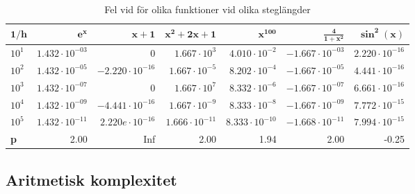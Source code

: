 \documentclass[a4paper,titlepage]{article}
\begin{document}
\begin{table}[h]
    \begin{tabular}{l | r | r | r | r | r | r}
        $\mathbf{1/h}$ & $\mathbf{e^x}$ & $\mathbf{x + 1}$ & $\mathbf{x^2 + 2x + 1}$ & $\mathbf{x^{100}}$ & $\mathbf{\frac{4}{1 + x^2}}$ & $\mathbf{\sin^2(x)}$ \\ \hline
        $10^1$         & $1.432 \cdot 10^{-03}$ & $0                    $  & $1.667 \cdot 10^{3}  $ & $4.010 \cdot 10^{-2} $ & $-1.667 \cdot 10^{-03}$ & $2.220 \cdot 10^{-16}$ \\
        $10^2$         & $1.432 \cdot 10^{-05}$ & $-2.220 \cdot 10^{-16}$  & $1.667 \cdot 10^{-5} $ & $8.202 \cdot 10^{-4} $ & $-1.667 \cdot 10^{-05}$ & $4.441 \cdot 10^{-16}$ \\
        $10^3$         & $1.432 \cdot 10^{-07}$ & $0                    $  & $1.667 \cdot 10^{7}  $ & $8.332 \cdot 10^{-6} $ & $-1.667 \cdot 10^{-07}$ & $6.661 \cdot 10^{-16}$ \\
        $10^4$         & $1.432 \cdot 10^{-09}$ & $-4.441 \cdot 10^{-16}$  & $1.667 \cdot 10^{-9} $ & $8.333 \cdot 10^{-8} $ & $-1.667 \cdot 10^{-09}$ & $7.772 \cdot 10^{-15}$ \\
        $10^5$         & $1.432 \cdot 10^{-11}$ & $2.220e \cdot 10^{-16}$  & $1.666 \cdot 10^{-11}$ & $8.333 \cdot 10^{-10}$ & $-1.668 \cdot 10^{-11}$ & $7.994 \cdot 10^{-15}$ \\ \hline
        \textbf{p}     & 2.00                   & Inf                      & 2.00                   & 1.94                   & 2.00                    & -0.25 \\
    \end{tabular}
    \caption{Fel vid för olika funktioner vid olika steglängder}
    \label{tab:errors}
\end{table}


\subsection{Aritmetisk komplexitet}
\end{document}
